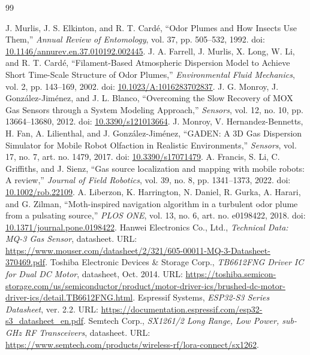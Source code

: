 \begin{thebibliography}{99}
\footnotesize
\raggedright
\setlength{\itemsep}{0.5pt}
 J. Murlis, J. S. Elkinton, and R. T. Cardé, ``Odor Plumes and How Insects Use Them,'' \textit{Annual Review of Entomology}, vol. 37, pp. 505--532, 1992. doi: \href{https://doi.org/10.1146/annurev.en.37.010192.002445}{10.1146/annurev.en.37.010192.002445}.
 J. A. Farrell, J. Murlis, X. Long, W. Li, and R. T. Cardé, ``Filament-Based Atmospheric Dispersion Model to Achieve Short Time-Scale Structure of Odor Plumes,'' \textit{Environmental Fluid Mechanics}, vol. 2, pp. 143--169, 2002. doi: \href{https://doi.org/10.1023/A:1016283702837}{10.1023/A:1016283702837}.
 J. G. Monroy, J. González-Jiménez, and J. L. Blanco, ``Overcoming the Slow Recovery of MOX Gas Sensors through a System Modeling Approach,'' \textit{Sensors}, vol. 12, no. 10, pp. 13664--13680, 2012. doi: \href{https://doi.org/10.3390/s121013664}{10.3390/s121013664}.
 J. Monroy, V. Hernandez-Bennetts, H. Fan, A. Lilienthal, and J. González-Jiménez, ``GADEN: A 3D Gas Dispersion Simulator for Mobile Robot Olfaction in Realistic Environments,'' \textit{Sensors}, vol. 17, no. 7, art. no. 1479, 2017. doi: \href{https://doi.org/10.3390/s17071479}{10.3390/s17071479}.
 A. Francis, S. Li, C. Griffiths, and J. Sienz, ``Gas source localization and mapping with mobile robots: A review,'' \textit{Journal of Field Robotics}, vol. 39, no. 8, pp. 1341--1373, 2022. doi: \href{https://doi.org/10.1002/rob.22109}{10.1002/rob.22109}.
 A. Liberzon, K. Harrington, N. Daniel, R. Gurka, A. Harari, and G. Zilman, ``Moth-inspired navigation algorithm in a turbulent odor plume from a pulsating source,'' \textit{PLOS ONE}, vol. 13, no. 6, art. no. e0198422, 2018. doi: \href{https://doi.org/10.1371/journal.pone.0198422}{10.1371/journal.pone.0198422}.
 Hanwei Electronics Co., Ltd., \textit{Technical Data: MQ-3 Gas Sensor}, datasheet. URL: \url{https://www.mouser.com/datasheet/2/321/605-00011-MQ-3-Datasheet-370469.pdf}.
 Toshiba Electronic Devices \& Storage Corp., \textit{TB6612FNG Driver IC for Dual DC Motor}, datasheet, Oct. 2014. URL: \url{https://toshiba.semicon-storage.com/us/semiconductor/product/motor-driver-ics/brushed-dc-motor-driver-ics/detail.TB6612FNG.html}.
 Espressif Systems, \textit{ESP32-S3 Series Datasheet}, ver. 2.2. URL: \url{https://documentation.espressif.com/esp32-s3_datasheet_en.pdf}.
 Semtech Corp., \textit{SX1261/2 Long Range, Low Power, sub-GHz RF Transceivers}, datasheet. URL: \url{https://www.semtech.com/products/wireless-rf/lora-connect/sx1262}.
\end{thebibliography}
